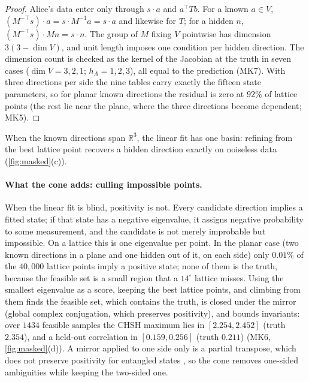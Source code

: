 \documentclass[11pt]{article}
\theoremstyle{definition}\newtheorem{definition}[theorem]{Definition}\newtheorem{remark}[theorem]{Remark}\newtheorem{example}[theorem]{Example}
\newcommand{\R}{\mathbb R}
\begin{document}
\begin{proof}
Alice's data enter only through $s\cdot a$ and $a^{\!\top}Tb$. For a known $a\in V$, $(M^{-\top}s)\cdot a=s\cdot M^{-1}a=s\cdot a$ and likewise for
$T$; for a hidden $n$, $(M^{-\top}s)\cdot Mn=s\cdot n$. The group of $M$ fixing $V$ pointwise has dimension $3(3-\dim V)$, and unit length
imposes one condition per hidden direction. The dimension count is checked as the kernel of the Jacobian at the truth in seven cases
($\dim V=3,2,1$; $h_A=1,2,3$), all equal to the prediction (MK7). With three directions per side the nine tables carry exactly the fifteen
state parameters, so for planar known directions the residual is zero at $92\%$ of lattice points (the rest lie near the plane, where the
three directions become dependent; MK5).
\end{proof}

When the known directions span $\R^3$, the linear fit has one basin: refining from the best lattice point recovers a hidden direction
exactly on noiseless data (\cref{fig:masked}(c)).

\paragraph{What the cone adds: culling impossible points.}
When the linear fit is blind, positivity is not. Every candidate direction implies a fitted state; if that state has a negative
eigenvalue, it assigns negative probability to some measurement, and the candidate is not merely improbable but impossible. On a lattice
this is one eigenvalue per point. In the planar case (two known directions in a plane and one hidden out of it, on each side) only
$0.01\%$ of the $40{,}000$ lattice points imply a positive state; none of them is the truth, because the feasible set is a small region
that a $14^\circ$ lattice misses. Using the smallest eigenvalue as a score, keeping the best lattice points, and climbing from them finds
the feasible set, which contains the truth, is closed under the mirror (global complex conjugation, which preserves positivity), and
bounds invariants: over $1434$ feasible samples the CHSH maximum \cite{Horodecki1995} lies in $[2.254,2.452]$ (truth $2.354$), and a
held-out correlation in $[0.159,0.256]$ (truth $0.211$) (MK6, \cref{fig:masked}(d)). A mirror applied to one side only is a partial
transpose, which does not preserve positivity for entangled states \cite{Peres1996}, so the cone removes one-sided ambiguities while
keeping the two-sided one.
\end{document}
